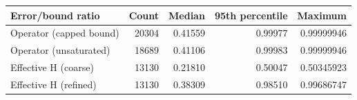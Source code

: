 \begin{tabular}{lrrrr}\toprule Error/bound ratio & Count & Median & 95th percentile & Maximum\\\midrule
Operator (capped bound) & 20304 & 0.41559 & 0.99977 & 0.99999946\\
Operator (unsaturated) & 18689 & 0.41106 & 0.99983 & 0.99999946\\
Effective H (coarse) & 13130 & 0.21810 & 0.50047 & 0.50345923\\
Effective H (refined) & 13130 & 0.38309 & 0.98510 & 0.99686747\\
\bottomrule\end{tabular}
